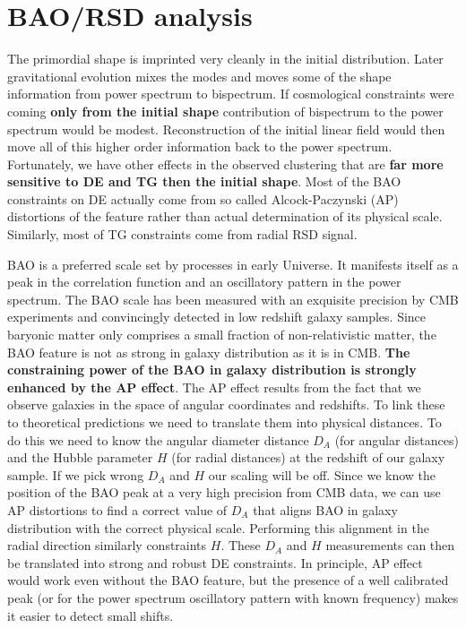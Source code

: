 \section{BAO/RSD analysis}

The primordial shape is imprinted very cleanly in the initial distribution.
Later gravitational evolution mixes the modes and moves some of the shape
information from power spectrum to bispectrum. If cosmological constraints
were coming \textbf{only from the initial shape} contribution of bispectrum to
the power spectrum would be modest. Reconstruction of the initial
linear field would then move all of this higher order information back to the
power spectrum. Fortunately, we have other effects in the observed clustering
that are \textbf{far more sensitive to DE and TG then the initial shape}. Most
of the BAO constraints on DE actually come from so called Alcock-Paczynski (AP)
distortions of the feature rather than actual determination of its physical
scale. Similarly, most of TG constraints come from radial RSD signal.

BAO is a preferred scale set by processes in early Universe. It manifests
itself as a peak in the correlation function and an oscillatory pattern in the
power spectrum. The BAO scale has been measured with an exquisite precision by
CMB experiments and convincingly detected in low redshift galaxy samples. Since
baryonic matter only comprises a small fraction of non-relativistic matter, the
BAO feature is not as strong in galaxy distribution as it is in CMB. \textbf{The
constraining power of the BAO in galaxy distribution is strongly enhanced by
the AP effect}. The AP effect results from the fact that we observe galaxies in the space of
angular coordinates and redshifts. To link these  to theoretical  predictions
we need to translate them into physical distances. To do this we need to know
the angular diameter distance $D_A$ (for angular distances)  and the Hubble
parameter $H$ (for radial distances) at the redshift of our galaxy sample. If
we pick wrong $D_A$ and $H$ our scaling will be off. Since we know the
position of the BAO peak at a very high precision from CMB data, we can use AP
distortions to find a correct value of $D_A$ that aligns BAO in galaxy
distribution with the correct physical scale. Performing this alignment in the
radial direction similarly constraints $H$. These $D_A$ and $H$ measurements
can then be translated into strong and robust DE constraints. In principle, AP
effect would work even without the BAO feature, but the presence of a well
calibrated peak (or for the power spectrum oscillatory pattern with known
frequency) makes it easier to detect small shifts.


